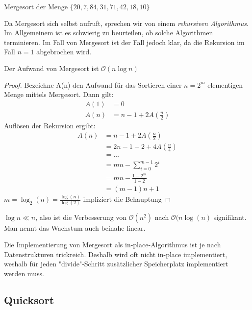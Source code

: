 \begin{example}
Mergesort der Menge $\{20,7,84,31,71,42,18,10\} $
\end{example}
\begin{remark}
Da Mergesort sich selbst aufruft, sprechen wir von einem \emph{rekursiven Algorithmus}. Im Allgemeinem ist es schwierig zu beurteilen, ob solche Algorithmen terminieren. Im Fall von Mergesort ist der Fall jedoch klar, da die Rekursion im Fall $n=1$ abgebrochen wird.
\end{remark}
\begin{theorem}
	\label{thm:mergesort}
	Der Aufwand von Mergesort ist $\mathcal{O}(n \log n)$
\end{theorem}
\begin{proof}
Bezeichne A(n) den Aufwand für das Sortieren einer $n=2^{m}$ elementigen Menge mittels Mergesort. Dann gilt:
\begin{align*}
	A(1)&=0 \\
	A(n)&=n-1 + 2A(\frac{n}{2})
\end{align*}
Auflösen der Rekursion ergibt:
\begin{align*}
	A(n)
	&=n-1+2A(\frac{n}{2})\\
	&=2n-1-2+4A(\frac{n}{4})\\
	&=\ldots \\
	&=mn-\sum_{i=0}^{m-1}2^{i} \\
	&= mn- \frac{1-2^{m}}{1-2} \\
	&= (m-1)n+1
\end{align*}
$m=\log_2(n)=\frac{\log(n)}{\log(2)}$ impliziert die Behauptung
\end{proof}
$\log n \ll n$, also ist die Verbesserung von $\mathcal{O}(n^2)$ nach $\mathcal{O}(n\log(n)$ signifikant.
Man nennt das Wachstum auch beinahe linear.

\begin{remark}
Die Implementierung von Mergesort als in-place-Algorithmus ist je nach Datenstrukturen trickreich. Deshalb wird oft nicht in-place implementiert, weshalb für jeden "divide"-Schritt zusätzlicher Speicherplatz implementiert werden muss.
\end{remark}
\subsection{Quicksort}
